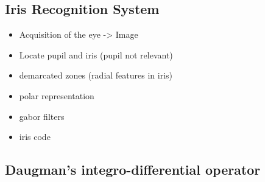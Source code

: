 \documentclass[paper=a4, fontsize=11pt]{scrartcl} %
\numberwithin{equation}{section} %
\numberwithin{figure}{section} %
\numberwithin{table}{section} %
\begin{document}
\subsection{Iris Recognition System}

\begin{itemize}
\item Acquisition of the eye -> Image
\item Locate pupil and iris (pupil not relevant)
\item demarcated zones (radial features in iris)
\item polar representation
\item gabor filters
\item iris code
\end{itemize}

\subsection{Daugman's integro-differential operator}
\end{document}
